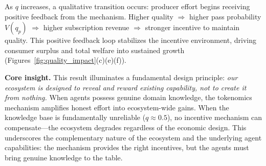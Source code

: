 As $q$ increases, a qualitative transition occurs: producer effort begins receiving positive feedback from the mechanism.
Higher quality $\Rightarrow$ higher pass probability $V(q_p)$ $\Rightarrow$ higher subscription revenue $\Rightarrow$ stronger incentive to maintain quality.
This positive feedback loop stabilizes the incentive environment, driving consumer surplus and total welfare into sustained growth (Figures~\ref{fig:quality_impact}(c)(e)(f)).

\textbf{Core insight.}
This result illuminates a fundamental design principle: \textit{our ecosystem is designed to reveal and reward existing capability, not to create it from nothing.}
When agents possess genuine domain knowledge, the tokenomics mechanism amplifies honest effort into ecosystem-wide gains.
When the knowledge base is fundamentally unreliable ($q \approx 0.5$), no incentive mechanism can compensate---the ecosystem degrades regardless of the economic design.
This underscores the complementary nature of the ecosystem and the underlying agent capabilities: the mechanism provides the right incentives, but the agents must bring genuine knowledge to the table.
